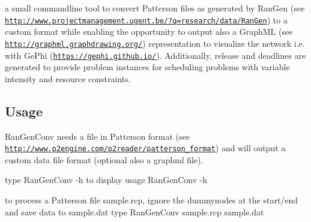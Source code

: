 a small commandline tool to convert Patterson files as generated by Ran\+Gen (see \href{http://www.projectmanagement.ugent.be/?q=research/data/RanGen}{\tt http\+://www.\+projectmanagement.\+ugent.\+be/?q=research/data/\+Ran\+Gen}) to a custom format while enabling the opportunity to output also a Graph\+M\+L (see \href{http://graphml.graphdrawing.org/}{\tt http\+://graphml.\+graphdrawing.\+org/}) representation to visualize the network i.\+e. with Ge\+Phi (\href{https://gephi.github.io/}{\tt https\+://gephi.\+github.\+io/}). Additionally, release and deadlines are generated to provide problem instances for scheduling problems with variable intensity and resource constraints.

\subsection*{Usage }

Ran\+Gen\+Conv needs a file in Patterson format (see \href{http://www.p2engine.com/p2reader/patterson_format}{\tt http\+://www.\+p2engine.\+com/p2reader/patterson\+\_\+format}) and will output a custom data file format (optional also a graphml file).


\begin{DoxyEnumerate}
\item type Ran\+Gen\+Conv -\/h to display usage Ran\+Gen\+Conv -\/h
\item to process a Patterson file \textquotesingle{}sample.\+rcp\textquotesingle{}, ignore the dummynodes at the start/end and save data to sample.\+dat type Ran\+Gen\+Conv sample.\+rcp sample.\+dat 
\end{DoxyEnumerate}